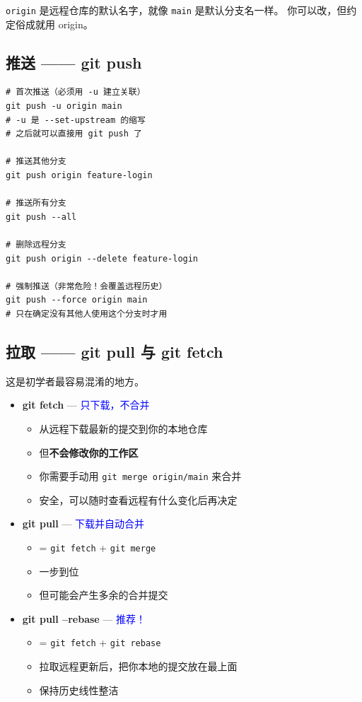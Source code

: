 \documentclass[12pt,a4paper]{article}
\begin{document}
\texttt{origin} 是远程仓库的默认名字，就像 \texttt{main} 是默认分支名一样。
你可以改，但约定俗成就用 origin。

\subsection{推送 —— git push}

\begin{lstlisting}
# 首次推送（必须用 -u 建立关联）
git push -u origin main
# -u 是 --set-upstream 的缩写
# 之后就可以直接用 git push 了

# 推送其他分支
git push origin feature-login

# 推送所有分支
git push --all

# 删除远程分支
git push origin --delete feature-login

# 强制推送（非常危险！会覆盖远程历史）
git push --force origin main
# 只在确定没有其他人使用这个分支时才用
\end{lstlisting}

\subsection{拉取 —— git pull 与 git fetch}

这是初学者最容易混淆的地方。

\begin{itemize}[itemsep=5pt]
    \item \textbf{git fetch} — \textcolor{blue}{只下载，不合并}
    \begin{itemize}
        \item 从远程下载最新的提交到你的本地仓库
        \item 但\textbf{不会修改你的工作区}
        \item 你需要手动用 \texttt{git merge origin/main} 来合并
        \item 安全，可以随时查看远程有什么变化后再决定
    \end{itemize}

    \item \textbf{git pull} — \textcolor{blue}{下载并自动合并}
    \begin{itemize}
        \item = \texttt{git fetch} + \texttt{git merge}
        \item 一步到位
        \item 但可能会产生多余的合并提交
    \end{itemize}

    \item \textbf{git pull --rebase} — \textcolor{blue}{推荐！}
    \begin{itemize}
        \item = \texttt{git fetch} + \texttt{git rebase}
        \item 拉取远程更新后，把你本地的提交放在最上面
        \item 保持历史线性整洁
    \end{itemize}
\end{itemize}
\end{document}
